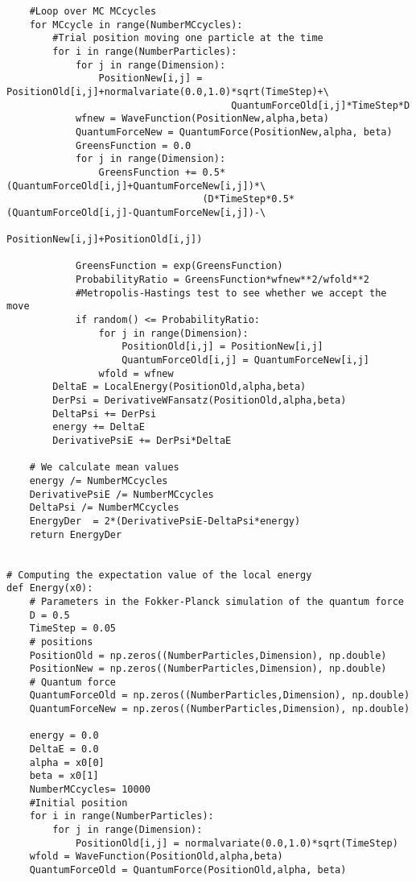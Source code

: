 \documentclass{beamer}
\begin{document}
\begin{frame}
\begin{verbatim}
    #Loop over MC MCcycles
    for MCcycle in range(NumberMCcycles):
        #Trial position moving one particle at the time
        for i in range(NumberParticles):
            for j in range(Dimension):
                PositionNew[i,j] = PositionOld[i,j]+normalvariate(0.0,1.0)*sqrt(TimeStep)+\
                                       QuantumForceOld[i,j]*TimeStep*D
            wfnew = WaveFunction(PositionNew,alpha,beta)
            QuantumForceNew = QuantumForce(PositionNew,alpha, beta)
            GreensFunction = 0.0
            for j in range(Dimension):
                GreensFunction += 0.5*(QuantumForceOld[i,j]+QuantumForceNew[i,j])*\
	                              (D*TimeStep*0.5*(QuantumForceOld[i,j]-QuantumForceNew[i,j])-\
                                      PositionNew[i,j]+PositionOld[i,j])
      
            GreensFunction = exp(GreensFunction)
            ProbabilityRatio = GreensFunction*wfnew**2/wfold**2
            #Metropolis-Hastings test to see whether we accept the move
            if random() <= ProbabilityRatio:
                for j in range(Dimension):
                    PositionOld[i,j] = PositionNew[i,j]
                    QuantumForceOld[i,j] = QuantumForceNew[i,j]
                wfold = wfnew
        DeltaE = LocalEnergy(PositionOld,alpha,beta)
        DerPsi = DerivativeWFansatz(PositionOld,alpha,beta)
        DeltaPsi += DerPsi
        energy += DeltaE
        DerivativePsiE += DerPsi*DeltaE
            
    # We calculate mean values
    energy /= NumberMCcycles
    DerivativePsiE /= NumberMCcycles
    DeltaPsi /= NumberMCcycles
    EnergyDer  = 2*(DerivativePsiE-DeltaPsi*energy)
    return EnergyDer


# Computing the expectation value of the local energy 
def Energy(x0):
    # Parameters in the Fokker-Planck simulation of the quantum force
    D = 0.5
    TimeStep = 0.05
    # positions
    PositionOld = np.zeros((NumberParticles,Dimension), np.double)
    PositionNew = np.zeros((NumberParticles,Dimension), np.double)
    # Quantum force
    QuantumForceOld = np.zeros((NumberParticles,Dimension), np.double)
    QuantumForceNew = np.zeros((NumberParticles,Dimension), np.double)

    energy = 0.0
    DeltaE = 0.0
    alpha = x0[0]
    beta = x0[1]
    NumberMCcycles= 10000
    #Initial position
    for i in range(NumberParticles):
        for j in range(Dimension):
            PositionOld[i,j] = normalvariate(0.0,1.0)*sqrt(TimeStep)
    wfold = WaveFunction(PositionOld,alpha,beta)
    QuantumForceOld = QuantumForce(PositionOld,alpha, beta)


\end{verbatim}
\end{frame}
\end{document}
